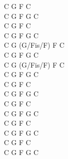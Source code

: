 \documentclass[a5paper, 10pt]{book}
\begin{document}
\begin{minipage}[t]{0.25\textwidth}
  C G F C\\
  C G F G C\\
  C G F C\\
  C G F G C\\

  C G (G/Fis/F) F C\\
  C G F G C\\
  C G (G/Fis/F) F C\\
  C G F G C\\

  C G F C\\
  C G F G C\\
  C G F C\\
  C G F G C\\

  C G F C\\
  C G F G C\\
  C G F C\\
  C G F G C\\

\end{minipage}

\newpage
\end{document}
